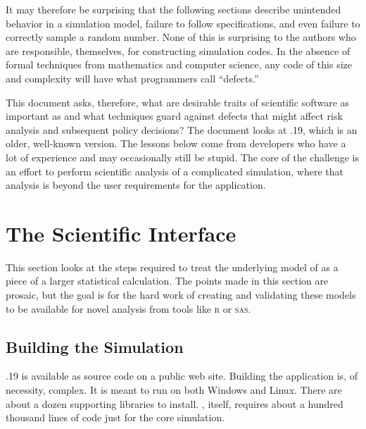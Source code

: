 \documentclass{article}
\begin{document}
It may therefore be surprising that the following sections
describe unintended behavior in a simulation model,
failure to follow specifications, and even failure to
correctly sample a random number. None of this is
surprising to the authors who are responsible, themselves,
for constructing simulation codes. In the absence of formal
techniques from mathematics and computer science, any code
of this size and complexity will have what programmers
call ``defects.''

This document asks, therefore, what are desirable traits
of scientific software as important as \naadsm and what techniques
guard against defects that might affect risk analysis and subsequent
policy decisions? The document looks at .19, which
is an older, well-known version. The lessons below come from
developers who have a lot of experience and may occasionally
still be stupid. The core of the challenge is an effort
to perform scientific analysis of a complicated simulation,
where that analysis is beyond the user requirements for
the application.


\section{The Scientific Interface}
This section looks at the steps required to treat the
underlying model of \naadsm as a piece of a larger
statistical calculation. The points made in this section
are prosaic, but the goal is for the hard work of
creating and validating these models to be available
for novel analysis from tools like \textsc{r} or \textsc{sas}.


\subsection{Building the Simulation}
.19 is available as source code on a public web site.
Building the application is, of necessity, complex. It is meant
to run on both Windows and Linux. There are about a dozen
supporting libraries to install. \naadsm, itself, requires about
a hundred thousand lines of code just for the core simulation.
\end{document}
